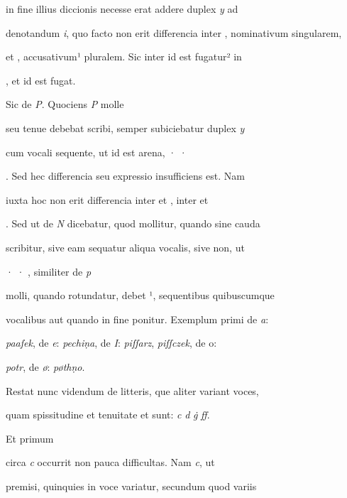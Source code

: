in fine illius diccionis  necesse erat addere duplex \textit{y} ad

denotandum \textit{i}, quo facto non erit differencia inter , nominativum singularem,

et , accusativum¹ pluralem. Sic inter  id est fugatur² in 

\splitlines
{}, et  id est fugat.

\indentK Sic de \textit{P}. Quociens \textit{P} molle

\fulllines
seu tenue debebat scribi, semper subiciebatur duplex \textit{y}

cum vocali sequente, ut  id est arena, · ·

. Sed hec differencia seu expressio insufficiens est. Nam

iuxta hoc non erit differencia inter  et , inter  et

. Sed ut de \textit{N} dicebatur, quod mollitur, quando sine cauda

scribitur, sive eam sequatur aliqua vocalis, sive non, ut

 · · , similiter de \textit{p}

molli, quando rotundatur, debet ¹, sequentibus quibuscumque

vocalibus aut quando in fine ponitur. Exemplum primi de \textit{a}:

\textit{paaſek}, de \textit{e}: \textit{pechiṇa}, de \textit{I}: \textit{piſſarz}, \textit{piſſczek}, de o\textit{}:

\textit{potr}, de \textit{ø}: \textit{pøthṇo}.

\indentP Restat nunc videndum de litteris, que aliter variant voces,

\splitlines
quam spissitudine et tenuitate et sunt: \textit{c} \textit{d} \textit{ġ} \textit{ff}.

\indentK Et primum

\fulllines

circa \textit{c} occurrit non pauca difficultas. Nam \textit{c}, ut

premisi, quinquies in voce variatur, secundum quod variis

